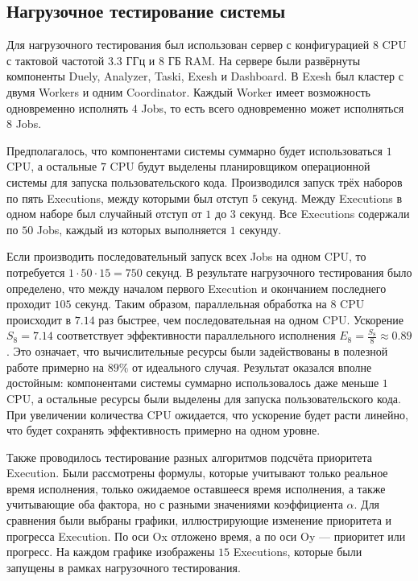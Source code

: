 \subsection{Нагрузочное тестирование системы}

Для нагрузочного тестирования был использован сервер с конфигурацией $8$ CPU с тактовой частотой $3.3$ ГГц и $8$ ГБ RAM.
На сервере были развёрнуты компоненты Duely, Analyzer, Taski, Exesh и Dashboard.
В Exesh был кластер с двумя Workers и одним Coordinator.
Каждый Worker имеет возможность одновременно исполнять $4$ Jobs, то есть всего одновременно может исполняться $8$ Jobs.

Предполагалось, что компонентами системы суммарно будет использоваться $1$ CPU,
а остальные $7$ CPU будут выделены планировщиком операционной системы для запуска пользовательского кода.
Производился запуск трёх наборов по пять Executions, между которыми был отступ $5$ секунд.
Между Executions в одном наборе был случайный отступ от $1$ до $3$ секунд.
Все Executions содержали по $50$ Jobs, каждый из которых выполняется $1$ секунду.

Если производить последовательный запуск всех Jobs на одном CPU, то потребуется $1 \cdot 50 \cdot 15 = 750$ секунд.
В результате нагрузочного тестирования было определено,
что между началом первого Execution и окончанием последнего проходит $105$ секунд.
Таким образом, параллельная обработка на $8$ CPU происходит в $7.14$ раз быстрее, чем последовательная на одном CPU.
Ускорение $S_8 = 7.14$ соответствует эффективности параллельного исполнения $E_8 = \frac{S_8}{8} \approx 0.89$.
Это означает, что вычислительные ресурсы были задействованы в полезной работе примерно на $89\%$ от идеального случая.
Результат оказался вполне достойным: компонентами системы суммарно использовалось даже меньше $1$ CPU,
а остальные ресурсы были выделены для запуска пользовательского кода.
При увеличении количества CPU ожидается, что ускорение будет расти линейно,
что будет сохранять эффективность примерно на одном уровне.

Также проводилось тестирование разных алгоритмов подсчёта приоритета Execution.
Были рассмотрены формулы, которые учитывают только реальное время исполнения, только ожидаемое оставшееся время исполнения,
а также учитывающие оба фактора, но с разными значениями коэффициента $\alpha$.
Для сравнения были выбраны графики, иллюстрирующие изменение приоритета и прогресса Execution.
По оси Ox отложено время, а по оси Oy --- приоритет или прогресс.
На каждом графике изображены $15$ Executions, которые были запущены в рамках нагрузочного тестирования.

